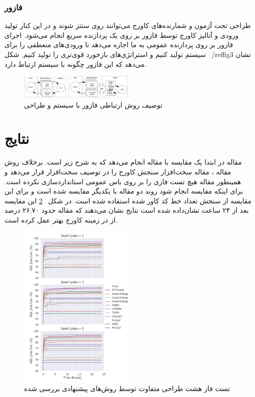 \documentclass[conference]{IEEEtran}
\begin{document}
\subsubsection{فازور}
طراحی تحت آزمون و شمارنده‌های کاورج می‌توانند روی
ستتز شوند و در این کنار تولید ورودی و آنالیز کاورج توسط فازور
بر روی یک پردازنده سریع انجام می‌شود.
اجرای فازور بر روی پردازنده عمومی به ما اجازه می‌دهد تا ورودی‌های
منعطفی را برای سیستم تولید کنیم و استراتژی‌های بازخورد
قوی‌تری را تولید کنیم.
شکل
~/ref{fig3}
نشان می‌دهد که این فازور چگونه با سیستم ارتباط دارد.
\begin{figure}[!t]
    \centering
    \includegraphics[width=0.5\textwidth]{rfuzz.png}
    \caption{
        توصیف روش ارتباطی فازور با سیستم و طراحی
    }
    \label{fig3}
\end{figure}

\section{نتایج}
مقاله
\cite{hf}
در ابتدا یک مقایسه با مقاله
\cite{rf}
انجام می‌دهد که به شرح زیر است.
برخلاف روش مقاله
،
مقاله
سخت‌افزار سنجش کاورج را در توصیف سخت‌افزار قرار می‌دهد
و همینطور مقاله
هیچ تست‌ فازی را بر روی باس عمومی استاندارد‌سازی نکرده است.
برای اینکه مقایسه انجام شود روند دو مقاله با یکدیگر مقایسه شده است
و برای این مقایسه از سنجش تعداد خط کد کاور شده استفاده شده است.
در شکل
~\ref{fig3}
این مقایسه بعد از ۲۴ ساعت نشان‌داده شده است
نتایج نشان می‌دهند که مقاله
حدود ۲۶.۷۰ درصد از
در زمینه کاورج بهتر  عمل کرده است.
\begin{figure}[!t]
    \centering
    \includegraphics[width=0.5\textwidth]{res1.png}
    \caption{
    تست فاز هشت طراحی متفاوت توسط روش‌های پیشنهادی بررسی شده    
    }
    \label{fig3}
\end{figure}
\end{document}
